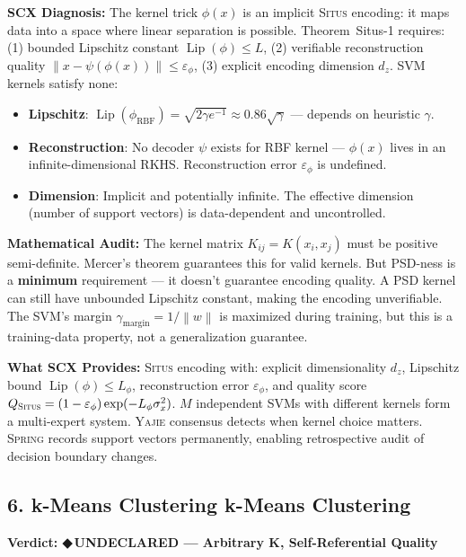 \documentclass[12pt,a4paper]{article}
\theoremstyle{definition}
\newcommand{\guilty}{{\color{guiltycolor}\textbf{◆\,UNDECLARED}}}
\newcommand{\Situs}{\textsc{Situs}}
\newcommand{\Yajie}{\textsc{Yajie}}
\newcommand{\Spring}{\textsc{Spring}}
\DeclareMathOperator{\Lip}{Lip}
\newcommand{\norm}[1]{\left\lVert#1\right\rVert}
\newcommand{\auditHeader}[1]{\medskip\noindent\textbf{\large #1}\medskip}
\newcommand{\whatMissing}{\noindent\textbf{What SCX Provides:} }
\newcommand{\diagnosis}{\noindent\textbf{SCX Diagnosis:} }
\newcommand{\mathAudit}{\noindent\textbf{Mathematical Audit:} }
\begin{document}
\diagnosis{} The kernel trick $\phi(x)$ is an implicit \Situs{} encoding: it maps data into a space where linear separation is possible. Theorem~Situs-1 requires: (1) bounded Lipschitz constant $\Lip(\phi) \le L$, (2) verifiable reconstruction quality $\norm{x - \psi(\phi(x))} \le \varepsilon_\phi$, (3) explicit encoding dimension $d_z$. SVM kernels satisfy none:
\begin{itemize}[nosep]
    \item \textbf{Lipschitz}: $\Lip(\phi_{\text{RBF}}) = \sqrt{2\gamma e^{-1}} \approx 0.86\sqrt{\gamma}$ — depends on heuristic $\gamma$.
    \item \textbf{Reconstruction}: No decoder $\psi$ exists for RBF kernel — $\phi(x)$ lives in an infinite-dimensional RKHS. Reconstruction error $\varepsilon_\phi$ is undefined.
    \item \textbf{Dimension}: Implicit and potentially infinite. The effective dimension (number of support vectors) is data-dependent and uncontrolled.
\end{itemize}

\mathAudit{} The kernel matrix $K_{ij} = K(x_i, x_j)$ must be positive semi-definite. Mercer's theorem guarantees this for valid kernels. But PSD-ness is a \textbf{minimum} requirement — it doesn't guarantee encoding quality. A PSD kernel can still have unbounded Lipschitz constant, making the encoding unverifiable. The SVM's margin $\gamma_{\text{margin}} = 1/\norm{w}$ is maximized during training, but this is a training-data property, not a generalization guarantee.

\whatMissing{} \Situs{} encoding with: explicit dimensionality $d_z$, Lipschitz bound $\Lip(\phi) \le L_\phi$, reconstruction error $\varepsilon_\phi$, and quality score $Q_{\Situs} = (1-\varepsilon_\phi)\exp(-L_\phi\sigma_x^2)$. $M$ independent SVMs with different kernels form a multi-expert system. \Yajie{} consensus detects when kernel choice matters. \Spring{} records support vectors permanently, enabling retrospective audit of decision boundary changes.

\subsection{6. k-Means Clustering k-Means Clustering}

\auditHeader{Verdict: \guilty{} — Arbitrary K, Self-Referential Quality}
\end{document}
